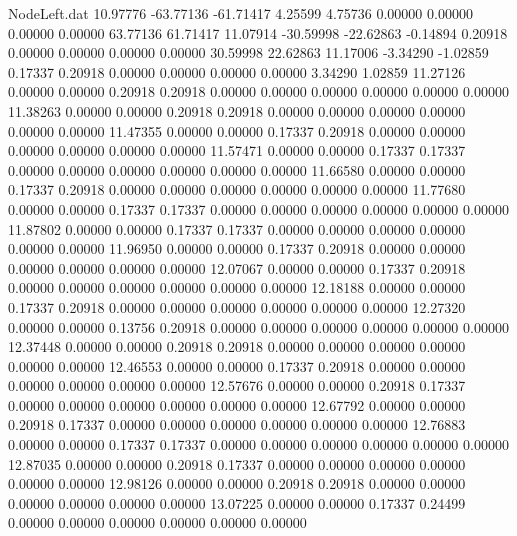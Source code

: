 \begin{filecontents}{NodeLeft.dat}
  10.97776  -63.77136  -61.71417     4.25599    4.75736    0.00000    0.00000    0.00000    0.00000   63.77136   61.71417
  11.07914  -30.59998  -22.62863    -0.14894    0.20918    0.00000    0.00000    0.00000    0.00000   30.59998   22.62863
  11.17006   -3.34290   -1.02859     0.17337    0.20918    0.00000    0.00000    0.00000    0.00000    3.34290    1.02859
  11.27126    0.00000    0.00000     0.20918    0.20918    0.00000    0.00000    0.00000    0.00000    0.00000    0.00000
  11.38263    0.00000    0.00000     0.20918    0.20918    0.00000    0.00000    0.00000    0.00000    0.00000    0.00000
  11.47355    0.00000    0.00000     0.17337    0.20918    0.00000    0.00000    0.00000    0.00000    0.00000    0.00000
  11.57471    0.00000    0.00000     0.17337    0.17337    0.00000    0.00000    0.00000    0.00000    0.00000    0.00000
  11.66580    0.00000    0.00000     0.17337    0.20918    0.00000    0.00000    0.00000    0.00000    0.00000    0.00000
  11.77680    0.00000    0.00000     0.17337    0.17337    0.00000    0.00000    0.00000    0.00000    0.00000    0.00000
  11.87802    0.00000    0.00000     0.17337    0.17337    0.00000    0.00000    0.00000    0.00000    0.00000    0.00000
  11.96950    0.00000    0.00000     0.17337    0.20918    0.00000    0.00000    0.00000    0.00000    0.00000    0.00000
  12.07067    0.00000    0.00000     0.17337    0.20918    0.00000    0.00000    0.00000    0.00000    0.00000    0.00000
  12.18188    0.00000    0.00000     0.17337    0.20918    0.00000    0.00000    0.00000    0.00000    0.00000    0.00000
  12.27320    0.00000    0.00000     0.13756    0.20918    0.00000    0.00000    0.00000    0.00000    0.00000    0.00000
  12.37448    0.00000    0.00000     0.20918    0.20918    0.00000    0.00000    0.00000    0.00000    0.00000    0.00000
  12.46553    0.00000    0.00000     0.17337    0.20918    0.00000    0.00000    0.00000    0.00000    0.00000    0.00000
  12.57676    0.00000    0.00000     0.20918    0.17337    0.00000    0.00000    0.00000    0.00000    0.00000    0.00000
  12.67792    0.00000    0.00000     0.20918    0.17337    0.00000    0.00000    0.00000    0.00000    0.00000    0.00000
  12.76883    0.00000    0.00000     0.17337    0.17337    0.00000    0.00000    0.00000    0.00000    0.00000    0.00000
  12.87035    0.00000    0.00000     0.20918    0.17337    0.00000    0.00000    0.00000    0.00000    0.00000    0.00000
  12.98126    0.00000    0.00000     0.20918    0.20918    0.00000    0.00000    0.00000    0.00000    0.00000    0.00000
  13.07225    0.00000    0.00000     0.17337    0.24499    0.00000    0.00000    0.00000    0.00000    0.00000    0.00000

\end{filecontents}
